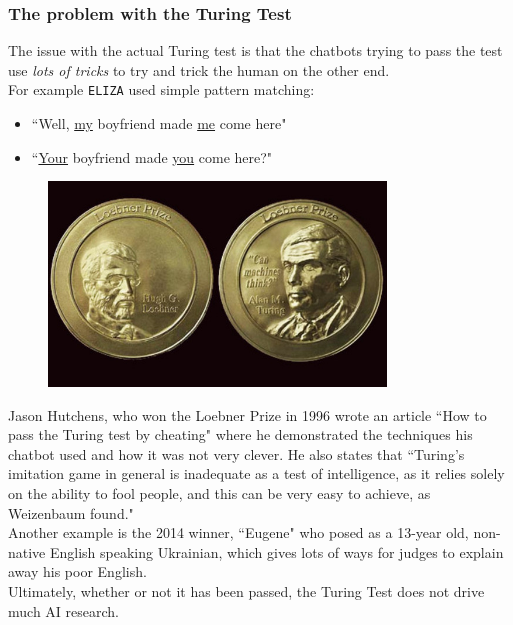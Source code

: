\documentclass{article}
\newcommand{\n}[0]{\\[\baselineskip]}
\begin{document}
\subsubsection{The problem with the Turing Test}
The issue with the actual Turing test is that the chatbots trying to pass the test use \textit{lots of tricks} to try and trick the human on the other end.
\n
For example \texttt{ELIZA} used simple pattern matching:
\begin{itemize}
\item ``Well, \underline{my} boyfriend made \underline{me} come here"
\item ``\underline{Your} boyfriend made \underline{you} come here?"
\end{itemize}
\begin{figure}[H]
\centering
\includegraphics[width=0.8\textwidth, keepaspectratio]{imgs/loebner-prize.jpg}
\end{figure}
Jason Hutchens, who won the Loebner Prize in 1996 wrote an article ``How to pass the Turing test by cheating" where he demonstrated the techniques his chatbot used and how it was not very clever. He also states that ``Turing's imitation game in general is inadequate as a test of intelligence, as it relies solely on the ability to fool people, and this can be very easy to achieve, as Weizenbaum found."
\n
Another example is the 2014 winner, ``Eugene" who posed as a 13-year old, non-native English speaking Ukrainian, which gives lots of ways for judges to explain away his poor English.
\n
Ultimately, whether or not it has been passed, the Turing Test does not drive much AI research.
\end{document}
